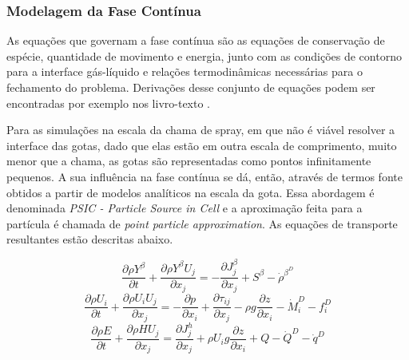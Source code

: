 



\subsubsection{Modelagem da Fase Contínua} \label{sec:gas}

As equações que governam a fase contínua são as equações de conservação de espécie, quantidade de movimento e energia, junto com as condições de contorno para a interface gás-líquido e relações termodinâmicas necessárias para o fechamento do problema.
Derivações desse conjunto de equações podem ser encontradas por exemplo nos livro-texto \cite{Williams1985,Kuo2005,Law2006}.

Para as simulações na escala da chama de spray, em que não é viável resolver a interface das gotas, dado que elas estão em outra escala de comprimento, muito menor que a chama, as gotas são representadas como pontos infinitamente pequenos.
A sua influência na fase contínua se dá, então, através de termos fonte obtidos a partir de modelos analíticos na escala da gota. 
Essa abordagem é denominada \emph{PSIC - Particle Source in Cell} e a aproximação feita para a partícula é chamada de \emph{point particle approximation}.
As equações de transporte resultantes estão descritas abaixo.

\begin{equation}
    \frac{\partial \rho Y^\beta}{\partial t} + 
    \frac{\partial \rho Y^\beta U_j}{\partial x_j} =
    - \frac{\partial J_j^\beta}{\partial x_j} +
    S^\beta -
    \dot \rho^{\beta^D}
\end{equation}
\begin{equation}
    \frac{\partial \rho U_i}{\partial t} + 
    \frac{\partial \rho U_i U_j}{\partial x_j} =
    - \frac{\partial p}{\partial x_i} +
    \frac{\partial \tau_{ij}}{\partial x_j} -
    \rho g\frac{\partial z}{\partial x_i} -
    \dot M_i^D -
    f_i^D
\end{equation}
\begin{equation}
    \frac{\partial \rho E}{\partial t} + 
    \frac{\partial \rho H U_j}{\partial x_j} =
    \frac{\partial J_j^h}{\partial x_j} +
    \rho U_i g \frac{\partial z}{\partial x_i} +
    Q -
    \dot Q^D -
    \dot q^D
\end{equation}

